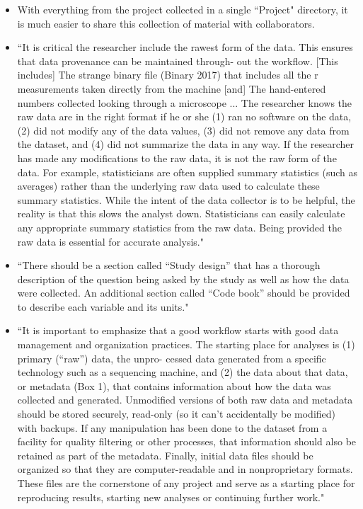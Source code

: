 \documentclass[pdftex,english,11pt,parskip=half]{scrartcl}
\begin{document}
\begin{itemize}
\item With everything from the project collected in a single ``Project" directory, it is much easier to share this collection of material with collaborators. 
\item ``It is critical the researcher include the rawest form of the data. This ensures that data provenance can be maintained through- out the workflow. [This includes] The strange binary file (Binary 2017) that includes all the r measurements taken directly from the machine [and] The hand-entered numbers collected looking through a
microscope ... The researcher knows the raw data are in the right format if
he or she (1) ran no software on the data, (2) did not modify any of the data values, (3) did not remove any data from the dataset, and (4) did not summarize the data in any way. If the researcher has made any modifications to the raw data, it is not the raw form of the data. For example, statisticians are often supplied summary statistics (such as averages) rather than the underlying raw data used to calculate these summary statistics. While the intent of the data collector is to be helpful, the reality is that this slows the analyst down. Statisticians can easily calculate any appropriate summary statistics from the raw data. Being provided the raw data is essential for accurate analysis." \cite{ellis2018share} 
\item ``There should be a section called “Study design” that has a thorough description of the question being asked by the study as well as how the data were collected. An additional section called “Code book” should be provided to describe each variable and its units." \cite{ellis2018share}
\item ``It is important to emphasize that a good workflow starts with good data management and organization practices. The starting place for analyses is (1) primary (“raw”) data, the unpro- cessed data generated from a specific technology such as a sequencing machine, and (2) the data about that data, or metadata (Box 1), that contains information about how the data was collected and generated. Unmodified versions of both raw data and metadata should be stored securely, read-only (so it can’t accidentally be modified) with backups. If any manipulation has been done to the dataset from a facility for quality filtering or other processes, that information should also be retained as part of the metadata. Finally, initial data files should be organized so that they are computer-readable and in nonproprietary formats. These files are the cornerstone of any project and serve as a starting place for reproducing results, starting new analyses or continuing further work." \cite{shade2015computing}
\end{itemize}
\end{document}
